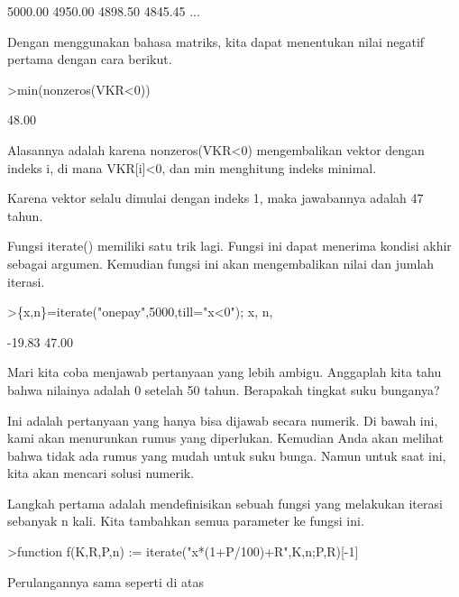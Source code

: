 \documentclass[a4paper,10pt]{article}
\begin{document}
\begin{eulernotebook}
\begin{eulercomment}
\begin{eulercomment}
\begin{eulercomment}
\begin{eulercomment}
\begin{eulercomment}
\begin{eulercomment}
\begin{eulercomment}
\begin{eulercomment}
\begin{euleroutput}
      5000.00     4950.00     4898.50     4845.45     ...
\end{euleroutput}
\begin{eulercomment}
Dengan menggunakan bahasa matriks, kita dapat menentukan nilai negatif
pertama dengan cara berikut.
\end{eulercomment}
\begin{eulerprompt}
>min(nonzeros(VKR<0))
\end{eulerprompt}
\begin{euleroutput}
        48.00 
\end{euleroutput}
\begin{eulercomment}
Alasannya adalah karena nonzeros(VKR\textless{}0) mengembalikan vektor dengan
indeks i, di mana VKR[i]\textless{}0, dan min menghitung indeks minimal.

Karena vektor selalu dimulai dengan indeks 1, maka jawabannya adalah
47 tahun.

Fungsi iterate() memiliki satu trik lagi. Fungsi ini dapat menerima
kondisi akhir sebagai argumen. Kemudian fungsi ini akan mengembalikan
nilai dan jumlah iterasi.
\end{eulercomment}
\begin{eulerprompt}
>\{x,n\}=iterate("onepay",5000,till="x<0"); x, n,
\end{eulerprompt}
\begin{euleroutput}
       -19.83 
        47.00 
\end{euleroutput}
\begin{eulercomment}
Mari kita coba menjawab pertanyaan yang lebih ambigu. Anggaplah kita
tahu bahwa nilainya adalah 0 setelah 50 tahun. Berapakah tingkat suku
bunganya?


Ini adalah pertanyaan yang hanya bisa dijawab secara numerik. Di bawah
ini, kami akan menurunkan rumus yang diperlukan. Kemudian Anda akan
melihat bahwa tidak ada rumus yang mudah untuk suku bunga. Namun untuk
saat ini, kita akan mencari solusi numerik.


Langkah pertama adalah mendefinisikan sebuah fungsi yang melakukan
iterasi sebanyak n kali. Kita tambahkan semua parameter ke fungsi ini.
\end{eulercomment}
\begin{eulerprompt}
>function f(K,R,P,n) := iterate("x*(1+P/100)+R",K,n;P,R)[-1]
\end{eulerprompt}
\begin{eulercomment}
Perulangannya sama seperti di atas


\end{eulercomment}
\end{eulercomment}
\end{eulercomment}
\end{eulercomment}
\end{eulercomment}
\end{eulercomment}
\end{eulercomment}
\end{eulercomment}
\end{eulercomment}
\end{eulernotebook}
\end{document}
